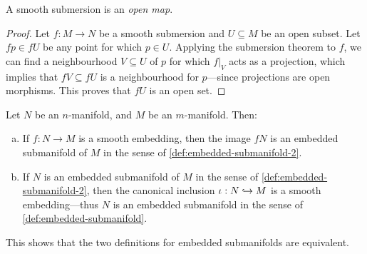 
\begin{corollary}
\label{cor:submersion-is-open}
A smooth submersion is an \emph{open map}.
\end{corollary}

\begin{proof}
Let \(f: M \to N\) be a smooth submersion and \(U \subseteq M\) be an open
subset. Let \(f p \in f U\) be any point for which \(p \in U\). Applying the
submersion theorem to \(f\), we can find a neighbourhood \(V \subseteq U\) of
\(p\) for which \(f|_V\) acts as a projection, which implies that
\(f V \subseteq f U\) is a neighbourhood for \(p\)---since projections are open
morphisms. This proves that \(f U\) is an open set.
\end{proof}

\begin{theorem}
\label{thm:embedded-submanifold-equivalent-definitions}
Let \(N\) be an \(n\)-manifold, and \(M\) be an \(m\)-manifold. Then:
\begin{enumerate}[(a)]\setlength\itemsep{0em}
\item If \(f: N \to M\) is a smooth embedding, then the image \(f N\) is an
  embedded submanifold of \(M\) in the sense of
  \cref{def:embedded-submanifold-2}.

\item If \(N\) is an embedded submanifold of \(M\) in the sense of
  \cref{def:embedded-submanifold-2}, then the canonical inclusion
  \(\iota: N \hookrightarrow M\) is a smooth embedding---thus \(N\) is an embedded
  submanifold in the sense of \cref{def:embedded-submanifold}.
\end{enumerate}
This shows that the two definitions for embedded submanifolds are equivalent.
\end{theorem}

